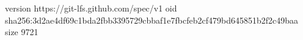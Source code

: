 version https://git-lfs.github.com/spec/v1
oid sha256:3d2ae4df69c1bda2fbb3395729cbbaf1e7fbcfeb2cf479bd645851b2f2c49baa
size 9721
